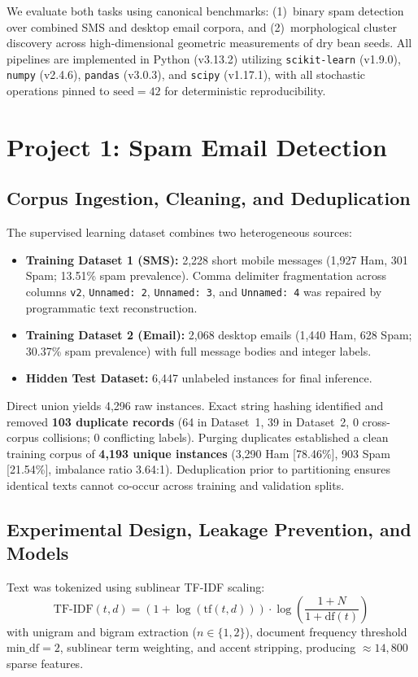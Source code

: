 \documentclass[9.5pt,twocolumn,letterpaper]{article}
\begin{document}
We evaluate both tasks using canonical benchmarks: (1)~binary spam detection over combined SMS and desktop email corpora, and (2)~morphological cluster discovery across high-dimensional geometric measurements of dry bean seeds. All pipelines are implemented in Python (v3.13.2) utilizing \texttt{scikit-learn} (v1.9.0), \texttt{numpy} (v2.4.6), \texttt{pandas} (v3.0.3), and \texttt{scipy} (v1.17.1), with all stochastic operations pinned to $\text{seed}=42$ for deterministic reproducibility.

\section{Project 1: Spam Email Detection}

\subsection{Corpus Ingestion, Cleaning, and Deduplication}
The supervised learning dataset combines two heterogeneous sources:
\begin{itemize}
  \item \textbf{Training Dataset 1 (SMS):} 2,228 short mobile messages (1,927 Ham, 301 Spam; 13.51\% spam prevalence). Comma delimiter fragmentation across columns \texttt{v2}, \texttt{Unnamed: 2}, \texttt{Unnamed: 3}, and \texttt{Unnamed: 4} was repaired by programmatic text reconstruction.
  \item \textbf{Training Dataset 2 (Email):} 2,068 desktop emails (1,440 Ham, 628 Spam; 30.37\% spam prevalence) with full message bodies and integer labels.
  \item \textbf{Hidden Test Dataset:} 6,447 unlabeled instances for final inference.
\end{itemize}

Direct union yields 4,296 raw instances. Exact string hashing identified and removed \textbf{103 duplicate records} (64 in Dataset~1, 39 in Dataset~2, 0 cross-corpus collisions; 0 conflicting labels). Purging duplicates established a clean training corpus of \textbf{4,193 unique instances} (3,290 Ham [78.46\%], 903 Spam [21.54\%], imbalance ratio 3.64:1). Deduplication prior to partitioning ensures identical texts cannot co-occur across training and validation splits.

\subsection{Experimental Design, Leakage Prevention, and Models}
Text was tokenized using sublinear TF-IDF scaling:
\begin{equation}
\text{TF-IDF}(t, d) = \left(1 + \log(\text{tf}(t, d))\right) \cdot \log\left(\frac{1 + N}{1 + \text{df}(t)}\right)
\end{equation}
with unigram and bigram extraction ($n \in \{1, 2\}$), document frequency threshold $\text{min\_df}=2$, sublinear term weighting, and accent stripping, producing $\approx 14,800$ sparse features.
\end{document}
